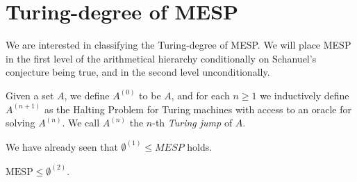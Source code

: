 \section{Turing-degree of MESP}
\label{sec:turing-degree-lics}

We are interested in classifying the Turing-degree of MESP\@.
We will place MESP in the first level of the arithmetical hierarchy conditionally on Schanuel's conjecture being true, and in the second level unconditionally.

Given a set $A$, we define $A^{(0)}$ to be $A$, and for each $n \geq 1$ we inductively define $A^{(n+1)}$ as the Halting Problem for Turing machines with access to an oracle for solving $A^{(n)}$. We call $A^{(n)}$ the $n$-th \emph{Turing jump} of $A$.

We have already seen that $\emptyset^{(1)} \leq MESP$ holds.

\begin{theorem}
\label{thm:turing-degree-2}
$\mbox{MESP} \leq \emptyset^{(2)}$.
\end{theorem}

